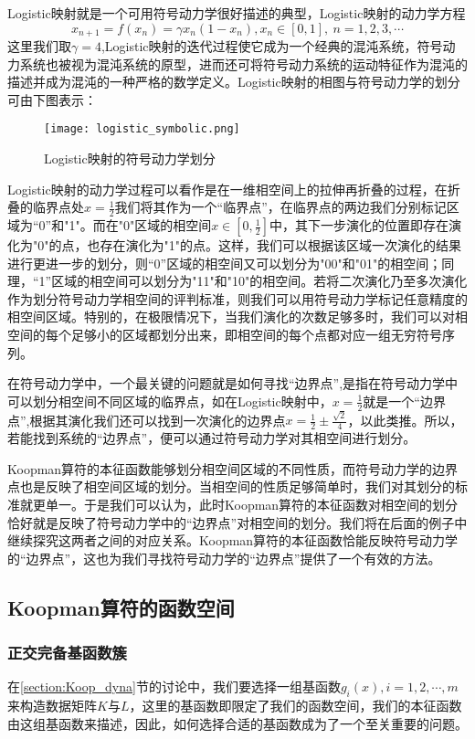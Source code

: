 Logistic映射就是一个可用符号动力学很好描述的典型，Logistic映射的动力学方程
\begin{equation}
    x_{n+1}=f(x_n)=\gamma x_n (1-x_n ),x_n∈[0,1],\ n=1,2,3,\cdots
\end{equation}
这里我们取$\gamma=4$,Logistic映射的迭代过程使它成为一个经典的混沌系统，符号动力系统也被视为混沌系统的原型，进而还可将符号动力系统的运动特征作为混沌的描述并成为混沌的一种严格的数学定义。Logistic映射的相图与符号动力学的划分可由下图表示：
\begin{figure}
	\centering
	\texttt{[image: logistic\_symbolic.png]}
    \caption{Logistic映射的符号动力学划分}
    \label{fig:logi_symb}
\end{figure}
Logistic映射的动力学过程可以看作是在一维相空间上的拉伸再折叠的过程，在折叠的临界点处$x=\frac{1}{2}$我们将其作为一个“临界点”，在临界点的两边我们分别标记区域为“0”和"1"。而在"0"区域的相空间$x\in [0,\frac{1}{2}]$中，其下一步演化的位置即存在演化为"0"的点，也存在演化为"1"的点。这样，我们可以根据该区域一次演化的结果进行更进一步的划分，则“0”区域的相空间又可以划分为"00"和"01"的相空间；同理，“1”区域的相空间可以划分为"11"和"10"的相空间。若将二次演化乃至多次演化作为划分符号动力学相空间的评判标准，则我们可以用符号动力学标记任意精度的相空间区域。特别的，在极限情况下，当我们演化的次数足够多时，我们可以对相空间的每个足够小的区域都划分出来，即相空间的每个点都对应一组无穷符号序列。

在符号动力学中，一个最关键的问题就是如何寻找“边界点”,是指在符号动力学中可以划分相空间不同区域的临界点，如在Logistic映射中，$x=\frac{1}{2}$就是一个“边界点”,根据其演化我们还可以找到一次演化的边界点$x=\frac{1}{2}\pm\frac{\sqrt{2}}{4}$，以此类推。所以，若能找到系统的“边界点”，便可以通过符号动力学对其相空间进行划分。

Koopman算符的本征函数能够划分相空间区域的不同性质，而符号动力学的边界点也是反映了相空间区域的划分。当相空间的性质足够简单时，我们对其划分的标准就更单一。于是我们可以认为，此时Koopman算符的本征函数对相空间的划分恰好就是反映了符号动力学中的“边界点”对相空间的划分。我们将在后面的例子中继续探究这两者之间的对应关系。Koopman算符的本征函数恰能反映符号动力学的“边界点”，这也为我们寻找符号动力学的“边界点”提供了一个有效的方法。

\subsection{Koopman算符的函数空间}
\subsubsection{正交完备基函数簇}
在\ref{section:Koop_dyna}节的讨论中，我们要选择一组基函数${g_i(x)},i=1,2,\cdots,m$来构造数据矩阵$K$与$L$，这里的基函数即限定了我们的函数空间，我们的本征函数由这组基函数来描述，因此，如何选择合适的基函数成为了一个至关重要的问题。


